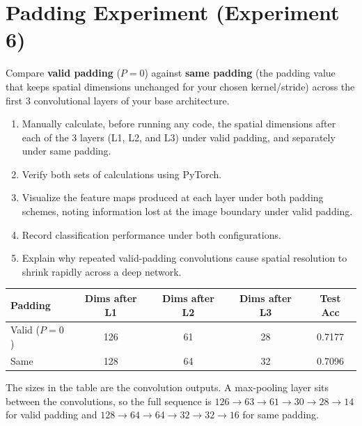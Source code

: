 \documentclass[12pt,a4paper]{article}
\begin{document}
\section{Padding Experiment (Experiment 6)}

Compare \textbf{valid padding} ($P=0$) against \textbf{same padding} (the padding
value that keeps spatial dimensions unchanged for your chosen kernel/stride) across
the first 3 convolutional layers of your base architecture.

\begin{stepbox}
\begin{enumerate}[leftmargin=*, label=\arabic*.]
  \item Manually calculate, before running any code, the spatial dimensions after
        each of the 3 layers (L1, L2, and L3) under valid padding, and separately under same padding.
  \item Verify both sets of calculations using PyTorch.
  \item Visualize the feature maps produced at each layer under both padding schemes,
        noting information lost at the image boundary under valid padding.
  \item Record classification performance under both configurations.
  \item Explain why repeated valid-padding convolutions cause spatial resolution to
        shrink rapidly across a deep network.
\end{enumerate}
\end{stepbox}

\begin{center}
\renewcommand{\arraystretch}{1.3}
\begin{tabular}{|l|c|c|c|c|}
\hline
\textbf{Padding} & \textbf{Dims after L1} & \textbf{Dims after L2} & \textbf{Dims after L3} & \textbf{Test Acc} \\
\hline
Valid ($P=0$) & 126 & 61 & 28 & 0.7177 \\
\hline
Same & 128 & 64 & 32 & 0.7096 \\
\hline
\end{tabular}
\end{center}

\begin{notebox}
The sizes in the table are the convolution outputs. A max-pooling layer sits between the convolutions, so the full
sequence is $126\to63\to61\to30\to28\to14$ for valid padding and $128\to64\to64\to32\to32\to16$ for same padding.
\end{notebox}
\end{document}
